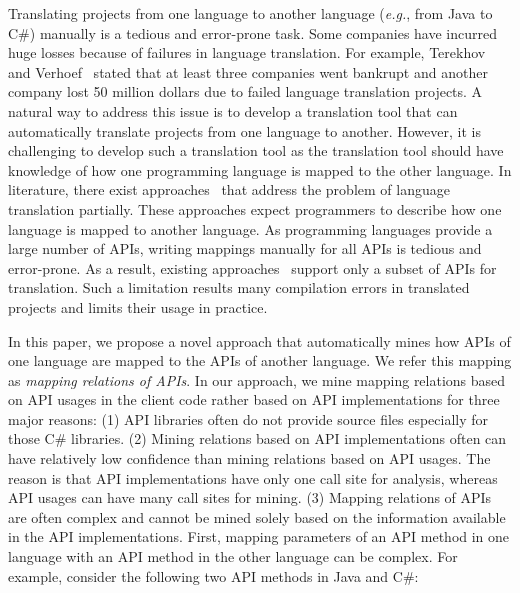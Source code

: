 Translating projects from one language to another language
(\emph{e.g.}, from Java to C\#) manually is a tedious and
error-prone task. Some companies have incurred huge losses because
of failures in language translation. For example, Terekhov and
Verhoef~\cite{terekhov2000realities} stated that at least three
companies went bankrupt and another company lost 50 million dollars
due to failed language translation projects. A natural way to address
this issue is to develop a translation tool that can automatically
translate projects from one language to another. However, it is
challenging to develop such a translation tool as the translation
tool should have knowledge of how one programming language is mapped
to the other language. In literature, there exist
approaches~\cite{mossienko2003automated, yasumatsu1995spice,
hainaut2008migration} that address the problem of language translation
partially. These approaches expect programmers to describe
how one language is mapped to another language.  As programming languages
provide a large number of APIs, writing mappings manually for all APIs
is tedious and error-prone. As a result, existing
approaches~\cite{mossienko2003automated,yasumatsu1995spice,hainaut2008migration}
support only a subset of APIs for translation. Such a limitation results
many compilation errors in translated projects and limits their usage in practice.

In this paper, we propose a novel approach that automatically mines how APIs of
one language are mapped to the APIs of another language. We refer
this mapping as \emph{mapping relations of APIs}. In our approach,
we mine mapping relations based on API usages in the client
code rather based on API implementations for three major reasons:
(1) API libraries often do not provide source files especially for
those C\# libraries. (2) Mining relations based on API
implementations often can have relatively low confidence than mining
relations based on API usages. The reason is that API
implementations have only one call site for analysis, whereas
API usages can have many call sites for mining. (3) Mapping
relations of APIs are often complex and cannot be mined solely based
on the information available in the API implementations. First,
mapping parameters of an API method in one language with an API
method in the other language can be complex. For example, consider
the following two API methods in Java and C\#:

